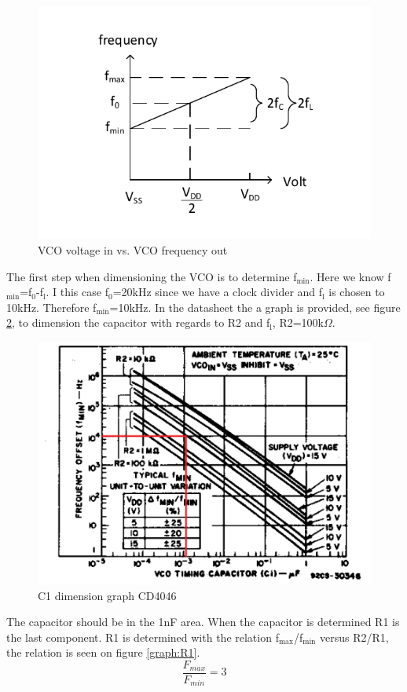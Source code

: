 \begin{figure}[H]
	\centering
	\includegraphics[width=.7\textwidth]{billeder/VCO_graph}
	\caption{VCO voltage in vs. VCO frequency out}
	\label{fig:VCO_graph}
\end{figure}

The first step when dimensioning the VCO is to determine f$_{\text{min}}$. Here we know f$_{\text{min}}$=f$_{\text{0}}$-f$_{\text{l}}$. I this case f$_{\text{0}}$=20kHz since we have a clock divider and f$_{\text{l}}$ is chosen to 10kHz. Therefore f$_{\text{min}}$=10kHz. In the datasheet the a graph is provided, see figure \ref{graph:C1}, to dimension the capacitor with regards to R2 and f$_{\text{l}}$, R2=100k$\Omega$.

\begin{figure}[H]
	\centering
	\includegraphics[width=.6\textwidth]{billeder/c1_graph_cd4046}
	\caption{C1 dimension graph CD4046}
	\label{graph:C1}
\end{figure}

The capacitor should be in the 1nF area.  When the capacitor is determined R1 is the last component. R1 is determined with the relation f$_{\text{max}}$/f$_{\text{min}}$ versus R2/R1, the relation is seen on figure \ref{graph:R1}. 
\begin{equation}
	\frac{F_{max}}{F_{min}}=3
\end{equation}

